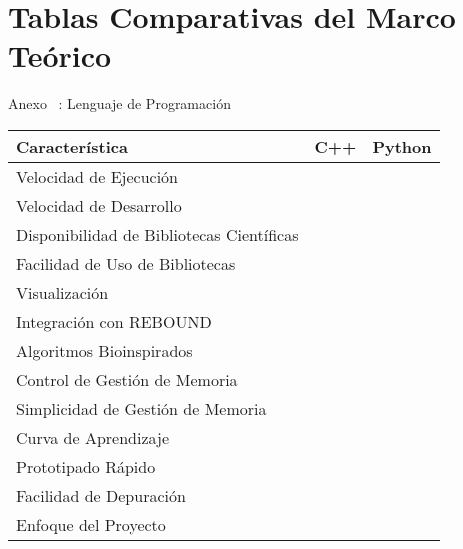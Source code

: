 \section[Comparativas]{Tablas Comparativas del Marco Teórico}

\begin{frame}{Anexo \thesection~: Lenguaje de Programación}
    \centering
    \label{tab:comparativa_languages}
    \vspace{-0.1cm}
    \begin{adjustbox}{max width=0.9\textwidth, max height=0.4\textheight, keepaspectratio}
        \renewcommand{\arraystretch}{1.1}
        \begin{tabular}{@{}p{7cm} >{\centering\arraybackslash}p{3.5cm} >{\centering\arraybackslash}p{3.5cm}@{}}
            \toprule
            \textbf{Característica} & \textbf{C++} & \textbf{Python} \\
            \midrule
            Velocidad de Ejecución & \color{green}{\checkmark} & \color{red}{\xmark} \\
            \midrule
            Velocidad de Desarrollo & \color{red}{\xmark} & \color{green}{\checkmark} \\
            \midrule
            Disponibilidad de Bibliotecas Científicas & \color{green}{\checkmark} & \color{green}{\checkmark} \\
            \midrule
            Facilidad de Uso de Bibliotecas & \color{red}{\xmark} & \color{green}{\checkmark} \\
            \midrule
            Visualización & \color{red}{\xmark} & \color{green}{\checkmark} \\
            \midrule
            Integración con REBOUND & \color{green}{\checkmark} & \color{green}{\checkmark} \\
            \midrule
            Algoritmos Bioinspirados & \color{green}{\checkmark} & \color{green}{\checkmark} \\
            \midrule
            Control de Gestión de Memoria & \color{green}{\checkmark} & \color{red}{\xmark} \\
            \midrule
            Simplicidad de Gestión de Memoria & \color{red}{\xmark} & \color{green}{\checkmark} \\
            \midrule
            Curva de Aprendizaje & \color{red}{\xmark} & \color{green}{\checkmark} \\
            \midrule
            Prototipado Rápido & \color{red}{\xmark} & \color{green}{\checkmark} \\
            \midrule
            Facilidad de Depuración & \color{red}{\xmark} & \color{green}{\checkmark} \\
            \midrule
            Enfoque del Proyecto & \color{red}{\xmark} & \color{green}{\checkmark} \\
            \bottomrule
        \end{tabular}
    \end{adjustbox}
    \smallskip
\end{frame}


